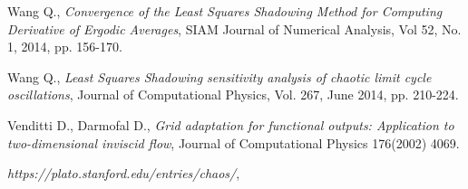 \documentclass[12pt]{article}
\begin{document}
\begin{thebibliography}{99}
 Wang Q.,
\emph{Convergence of the Least Squares Shadowing Method for Computing Derivative of Ergodic Averages},
SIAM Journal of Numerical Analysis, Vol 52, No. 1, 2014, pp. 156-170.  

 Wang Q., 
\emph{Least Squares Shadowing sensitivity analysis of chaotic limit cycle oscillations},
Journal of Computational Physics, Vol. 267, June 2014, pp. 210-224.  

 Venditti D., Darmofal D.,
\emph{Grid adaptation for functional outputs: Application to two-dimensional inviscid flow},
Journal of Computational Physics 176(2002) 4069.

\emph{https://plato.stanford.edu/entries/chaos/},
\end{thebibliography} 
\end{document}
